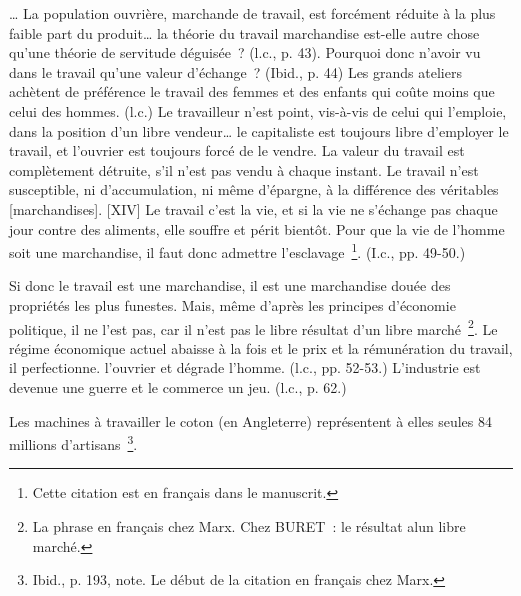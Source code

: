 \documentclass[french,twoside]{book} %
\newenvironment{quoteblock}%
  {\begin{quoting}}
  {\end{quoting}}
\newenvironment{quotebar}{%
    \def\FrameCommand{{\color{rubric!10!}\vrule width 0.5em} \hspace{0.9em}}%
    \def\OuterFrameSep{\itemsep} %
    \MakeFramed {\advance\hsize-\width \FrameRestore}
  }%
  {%
    \endMakeFramed
  }
\renewenvironment{quoteblock}%
  {%
    \savenotes
    \setstretch{0.9}
    \normalfont
    \begin{quotebar}
  }
  {%
    \end{quotebar}
    \spewnotes
  }
\begin{document}
\begin{quoteblock}
 … La population ouvrière, marchande de travail, est forcément réduite à la plus faible part du produit… la théorie du travail marchandise est-elle autre chose qu’une théorie de servitude déguisée ? (l.c., p. 43). Pourquoi donc n’avoir vu dans le travail qu’une valeur d’échange ? (Ibid., p. 44) Les grands ateliers achètent de préférence le travail des femmes et des enfants qui coûte moins que celui des hommes. (l.c.) Le travailleur n’est point, vis-à-vis de celui qui l’emploie, dans la position d’un libre vendeur… le capitaliste est toujours libre d’employer le travail, et l’ouvrier est toujours forcé de le vendre. La valeur du travail est complètement détruite, s’il n’est pas vendu à chaque instant. Le travail n’est susceptible, ni d’accumulation, ni même d’épargne, à la différence des véritables [marchandises]. [XIV] Le travail c’est la vie, et si la vie ne s’échange pas chaque jour contre des aliments, elle souffre et périt bientôt. Pour que la vie de l’homme soit une marchandise, il faut donc admettre l’esclavage \footnote{Cette citation est en français dans le manuscrit.}. (I.c., pp. 49-50.)\par
 Si donc le travail est une marchandise, il est une marchandise douée des propriétés les plus funestes. Mais, même d’après les principes d’économie politique, il ne l’est pas, car il n’est pas le libre résultat d’un libre marché \footnote{La phrase en français chez Marx. Chez BURET : le résultat alun libre marché.}. Le régime économique actuel abaisse à la fois et le prix et la rémunération du travail, il perfectionne. l’ouvrier et dégrade l’homme. (l.c., pp. 52-53.) L’industrie est devenue une guerre et le commerce un jeu. (l.c., p. 62.)\par
 Les machines à travailler le coton (en Angleterre) représentent à elles seules 84 millions d’artisans \footnote{Ibid., p. 193, note. Le début de la citation en français chez Marx.}.
 \end{quoteblock}

\bigbreak
\end{document}
